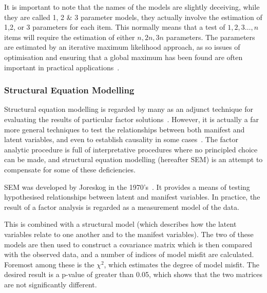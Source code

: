 
It is important to note that the names of the models are slightly deceiving, while they are called 1, 2 \& 3 parameter models, they actually involve the estimation of 1,2, or 3 parameters for each item. This normally means that a test of ${1,2,3\ldots, n}$ items will require the estimation of either ${n, 2n, 3n}$ parameters. The parameters are estimated by an iterative maximum likelihood approach, as so issues of optimisation and ensuring that a global maximum has been found are often important in practical applications~\cite{gill2002bayesian}.


\subsubsection{Structural Equation Modelling}
\label{sec:struct-equat-model}

Structural equation modelling is regarded by many as an adjunct technique for evaluating the results of particular factor solutions~\cite{fabrigar1999evaluating}. However, it is actually a far more general techniques to test the relationships between both manifest and latent variables, and even to establish causality in some cases~\cite{pearl1998graphs}. The factor analytic procedure is full of interpretative procedures where no principled choice can be made, and structural equation modelling (hereafter SEM) is an attempt to compensate for some of these deficiencies.

SEM was developed by Joreskog in the 1970's~\cite{joreskog1978structural}. It provides a means of testing hypothesised relationships between latent and manifest variables. In practice, the result of a factor analysis is regarded as a measurement model of the data.

This is combined with a structural model (which describes how the latent variables relate to one another and to the manifest variables). The two of these models are then used to construct a covariance matrix which is then compared with the observed data, and a number of indices of model misfit are calculated. Foremost among these is the $\chi^2$, which estimates the degree of model misfit. The desired result is a p-value of greater than 0.05, which shows that the two matrices are not significantly different.


